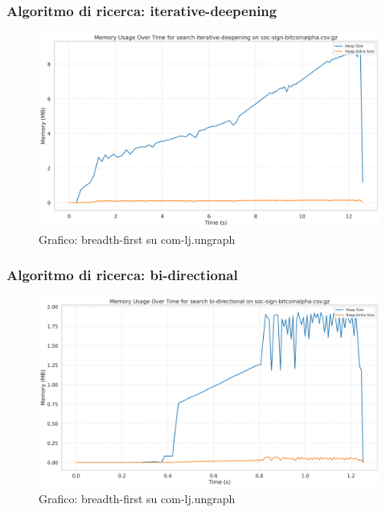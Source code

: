 \documentclass{article}
\begin{document}
\subsubsection{Algoritmo di ricerca: iterative-deepening}
\begin{figure}[h]\centering
	\includegraphics[width=\textwidth]{../plots/soc-sign-bitcoinalpha.csv_iterative-deepening.png}
	\caption{Grafico: breadth-first su com-lj.ungraph}
\end{figure}
\subsubsection{Algoritmo di ricerca: bi-directional}
\begin{figure}[h]\centering
	\includegraphics[width=\textwidth]{../plots/soc-sign-bitcoinalpha.csv_bi-directional.png}
	\caption{Grafico: breadth-first su com-lj.ungraph}
\end{figure}
\end{document}
